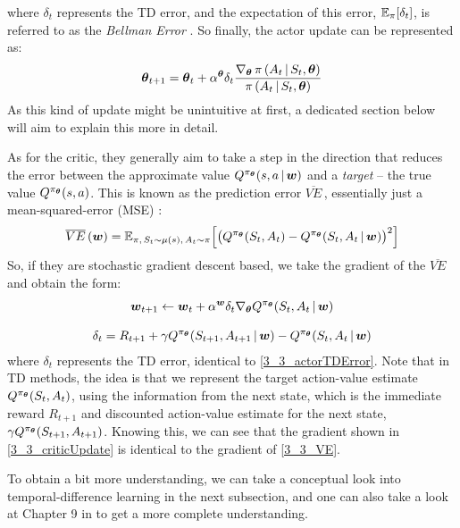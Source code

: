 where $\delta_t$ represents the TD error, and the expectation of this error, $\mathbb{E}_\pi[\delta_t]$, is referred to as the \textit{Bellman Error} \cite{suttonAndBartoBook}. So finally, the actor update can be represented as:\vspace{3mm}
\begin{equation}
    \bt_{t+1} = \bt_t + \alpha^{\bt} \delta_t \frac{\nbt \pi \, (A_t \, | \, S_t, \bt)}{\pi \, (A_t \, | \, S_t, \bt)} \vspace{3mm} \label{3_3_actorUpdate}
\end{equation} 
As this kind of update might be unintuitive at first, a dedicated section below will aim to explain this more in detail.

As for the critic, they generally aim to take a step in the direction that reduces the error between the approximate value $Q^{\pi_{\boldsymbol{\theta}}}(s, a \,| \,\boldsymbol{w})$ and a \textit{target} -- the true value $Q^{\pi_{\boldsymbol{\theta}}}(s,a)$. This is known as the prediction error $\overline{VE}\,$, essentially just a mean-squared-error (MSE)  \cite{suttonAndBartoBook}:
\begin{equation}
    \overline{VE}\,(\boldsymbol{w})= \mathbb{E}_{\pi, \, S_t \sim \mu(s), \, A_t \sim \pi} \Big[ 
    \big( Q^{\pi_{\boldsymbol{\theta}}}(S_t, A_t) - Q^{\pi_{\boldsymbol{\theta}}}(S_t, A_t \,| \,\boldsymbol{w}) \label{3_3_VE} \big)^2
    \Big]
\end{equation}
So, if they are stochastic gradient descent based, we take the gradient of the $\overline{VE}$ and obtain the form:
\begin{gather}
    \boldsymbol{w}_{t+1} \leftarrow \boldsymbol{w}_{t} + \alpha^{\boldsymbol{w}} \delta_t \nabla_{\boldsymbol{\theta}} Q^{\pi_{\boldsymbol{\theta}}} (S_t,A_t \, |\, \boldsymbol{w}) \label{3_3_criticUpdate} \\[3mm]
    \delta_t = R_{t+1} + \gamma Q^{\pi_{\boldsymbol{\theta}}}(S_{t+1}, A_{t+1} \,|\, \boldsymbol{w}) -Q^{\pi_{\boldsymbol{\theta}}} (S_t,A_t \,|\, \boldsymbol{w}) 
    \label{3_3_tdError}
\end{gather}
where $\delta_t$ represents the TD error, identical to \eqref{3_3_actorTDError}. Note that in TD methods, the idea is that we represent the target action-value estimate $Q^{\pi_{\boldsymbol{\theta}}}(S_t, A_t)$, using the information from the next state, which is the immediate reward $R_{t+1}$ and discounted action-value estimate for the next state, $\gamma Q^{\pi_{\boldsymbol{\theta}}}(S_{t+1}, A_{t+1})$. Knowing this, we can see that the gradient shown in \eqref{3_3_criticUpdate} is identical to the gradient of \eqref{3_3_VE}.

To obtain a bit more understanding, we can take a conceptual look into temporal-difference learning in the next subsection, and one can also take a look at Chapter 9 in \cite{suttonAndBartoBook} to get a more complete understanding.


